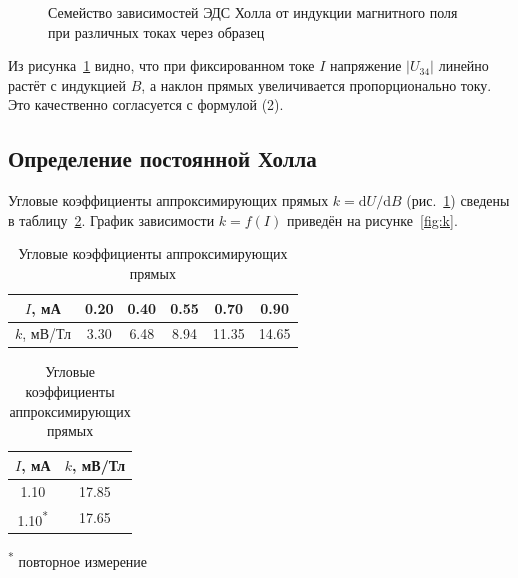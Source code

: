 \documentclass{article}
\begin{document}
\begin{figure}[H]
	\caption{Семейство зависимостей ЭДС Холла от индукции магнитного поля при различных токах через образец}
	\label{fig:hall}
\end{figure}

Из рисунка~\ref{fig:hall} видно, что при фиксированном токе $I$ напряжение $|U_{34}|$ линейно растёт с индукцией $B$, а наклон прямых увеличивается пропорционально току. Это качественно согласуется с формулой (2).

\subsection{Определение постоянной Холла}
Угловые коэффициенты аппроксимирующих прямых $k = \mathrm{d}U/\mathrm{d}B$ (рис.~\ref{fig:hall}) сведены в таблицу~\ref{tab:k}. График зависимости $k = f(I)$ приведён на рисунке~\ref{fig:k}.

\begin{table}[H]
	\centering
	\caption{Угловые коэффициенты аппроксимирующих прямых}
	\label{tab:k}
	\begin{tabular}{c ccccc}
		\toprule
		$I$, мА   & 0.20 & 0.40 & 0.55 & 0.70 & 0.90 \\
		\midrule
		$k$, мВ/Тл & 3.30 & 6.48 & 8.94 & 11.35 & 14.65 \\
		\bottomrule
	\end{tabular}
	\qquad
	\begin{tabular}{c c}
		\toprule
		$I$, мА & $k$, мВ/Тл \\
		\midrule
		1.10 & 17.85 \\
		1.10\textsuperscript{*} & 17.65 \\
		\bottomrule
	\end{tabular}
	\par\vspace{2pt}
	{\footnotesize\textsuperscript{*} повторное измерение}
\end{table}
\end{document}
